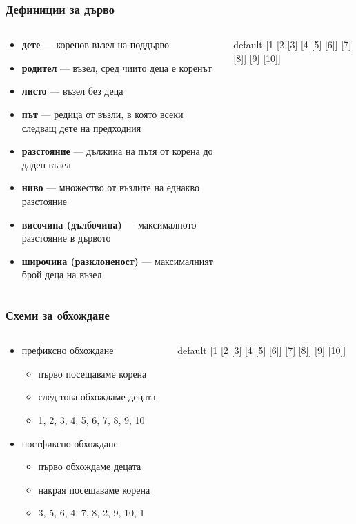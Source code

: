 \documentclass{beamer}
\newcommand{\sampletree}{%
  \begin{forest} default
    [1 [2 [3] [4 [5] [6]] [7] [8]] [9] [10]]
  \end{forest}%
}
\begin{document}
\begin{frame}
  \frametitle{Дефиниции за дърво}
  \begin{columns}
    \begin{column}{0.65\textwidth}
      \begin{itemize}
      \item \textbf{дете} --- коренов възел на поддърво
      \item \textbf{родител} --- възел, сред чиито деца е коренът
      \item \textbf{листо} --- възел без деца
      \item \textbf{път} --- редица от възли, в която всеки следващ дете на предходния
      \item \textbf{разстояние} --- дължина на пътя от корена до даден възел
      \item \textbf{ниво} --- множество от възлите на еднакво разстояние
      \item \textbf{височина (дълбочина)} --- максималното разстояние в дървото
      \item \textbf{широчина (разклоненост)} --- максималният брой деца на възел
      \end{itemize}
    \end{column}
    \begin{column}{0.35\textwidth}
      \sampletree
    \end{column}
  \end{columns}
\end{frame}

\begin{frame}
  \frametitle{Схеми за обхождане}
  \begin{columns}
    \begin{column}{0.65\textwidth}
      \begin{itemize}
      \item префиксно обхождане
        \begin{itemize}
        \item първо посещаваме корена
        \item след това обхождаме децата
          \pause
        \item 1, 2, 3, 4, 5, 6, 7, 8, 9, 10
        \end{itemize}
        \pause
      \item постфиксно обхождане
        \begin{itemize}
        \item първо обхождаме децата
        \item накрая посещаваме корена
          \pause
        \item 3, 5, 6, 4, 7, 8, 2, 9, 10, 1
        \end{itemize}
      \end{itemize}
    \end{column}
    \begin{column}{0.35\textwidth}
      \sampletree
    \end{column}
  \end{columns}
\end{frame}
\end{document}
